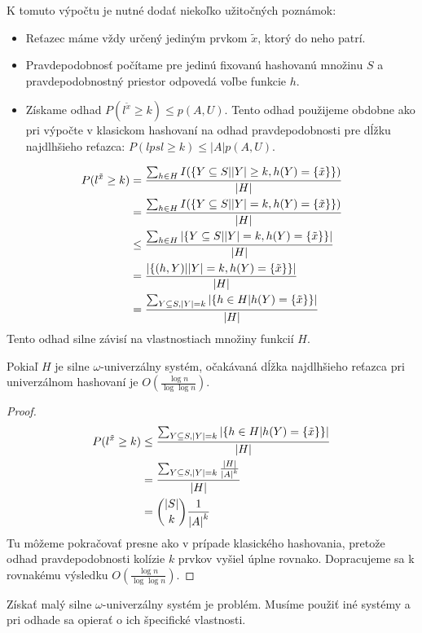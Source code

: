 K tomuto výpočtu je nutné dodať niekoľko užitočných poznámok:
\begin{itemize}
\item Reťazec máme vždy určený jediným prvkom $\tilde{x}$, ktorý do neho patrí.
\item Pravdepodobnosť počítame pre jedinú fixovanú hashovanú množinu $S$ a pravdepodobnostný priestor odpovedá voľbe funkcie $h$.
\item Získame odhad $P(l^{\tilde{x}} \geq k) \leq p(A, U)$. Tento odhad použijeme obdobne ako pri výpočte v klasickom hashovaní na odhad pravdepodobnosti pre dĺžku najdlhšieho reťazca: $P(lpsl \geq k) \leq |A| p(A, U)$.
\end{itemize}
\begin{displaymath}
\begin{split}
P(l^{\tilde{x}} \geq k) 
	& = \frac{\sum\displaylimits_{h \in H} I(\{ Y \subseteq S | |Y| \geq k, h(Y) = \{ \tilde{x} \} \})}{|H|} \\
	& = \frac{\sum\displaylimits_{h \in H} I(\{ Y \subseteq S | |Y| = k, h(Y) = \{ \tilde{x} \} \})}{|H|} \\
	& \leq \frac{\sum\displaylimits_{h \in H} |\{ Y \subseteq S | |Y| = k, h(Y) = \{ \tilde{x} \} \}|}{|H|} \\
	& = \frac{|\{ (h, Y) | |Y| = k, h(Y) = \{ \tilde{x} \} \}|}{|H|} \\
	& = \frac{\sum\displaylimits_{Y \subseteq S, |Y| = k} | \{ h \in H | h(Y) = \{\tilde{x}\} \}|}{|H|} \\
\end{split}
\end{displaymath}
Tento odhad silne závisí na vlastnostiach množiny funkcií $H$.
\begin{theorem}
Pokiaľ $H$ je silne $\omega$-univerzálny systém, očakávaná dĺžka najdlhšieho reťazca pri univerzálnom hashovaní je $O(\frac{\log n}{\log \log n})$.
\end{theorem}
\begin{proof}
\begin{displaymath}
\begin{split}
P(l^{\tilde{x}} \geq k) 
	& \leq \frac{\sum\displaylimits_{Y \subseteq S, |Y| = k} | \{ h \in H | h(Y) = \{\tilde{x}\} \}|}{|H|} \\
	& = \frac{\sum\displaylimits_{Y \subseteq S, |Y| = k} \frac{|H|}{{|A|}^{k}}}{|H|} \\
	& = \dbinom{|S|}{k}\frac{1}{{|A|}^k}
\end{split}
\end{displaymath}
Tu môžeme pokračovať presne ako v prípade klasického hashovania, pretože odhad pravdepodobnosti kolízie $k$ prvkov vyšiel úplne rovnako. Dopracujeme sa k rovnakému výsledku $O(\frac{\log n}{\log \log n})$.
\end{proof}
Získať malý silne $\omega$-univerzálny systém je problém. Musíme použiť iné systémy a pri odhade sa opierať o ich špecifické vlastnosti.
